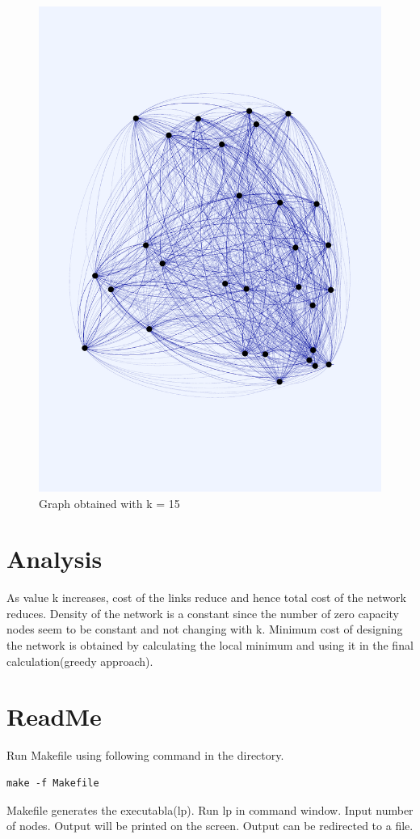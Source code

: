 \documentclass[11pt]{article}
\begin{document}
\begin{figure}
\includegraphics[scale=0.2]{Graph_K15}
\caption{Graph obtained with k = 15}
\end{figure}
 \section{Analysis}
 As value k increases, cost of the links reduce and hence total cost of the network reduces.
 Density of the network is a constant since the number of zero capacity nodes seem to be constant and not changing with k.
Minimum cost of designing the network is obtained by calculating the local minimum and using it in the final calculation(greedy approach).

 \section{ReadMe}
Run Makefile using following command in the directory.
\begin{lstlisting}
make -f Makefile
\end{lstlisting}
Makefile generates the executabla(lp).
Run lp in command window. Input number of nodes. Output will be printed on the screen.
Output can be redirected to a file.
\end{document}
